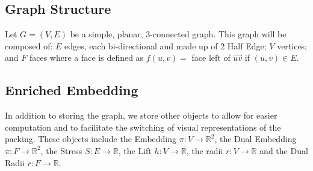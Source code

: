 \documentclass{article}
\begin{document}
\subsection{Graph Structure}
  Let $G=(V,E)$ be a simple, planar, 3-connected graph. This graph will be composed of: $E$ edges, each bi-directional and made up of 2 Half Edge; $V$ vertices; and $F$ faces where a face is defined as $f(u,v) =$ face left of $\overrightarrow{uv}$ if $(u,v)\in E$.
\subsection{Enriched Embedding}
  In addition to storing the graph, we store other objects to allow for easier computation and to facilitate the switching of visual representations of the packing. These objects include the Embedding $\pi : V \rightarrow \mathbb{R}^2$, the Dual Embedding $\overline{\pi} : F \rightarrow \mathbb{R}^2$, the Stress $S : E \rightarrow \mathbb{R}$, the Lift $h : V \rightarrow \mathbb{R}$, the radii $r : V \rightarrow \mathbb{R}$ and the Dual Radii $\overline{r} : F \rightarrow \mathbb{R}$.



\end{document}
